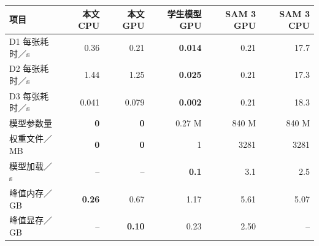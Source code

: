\begin{tabular}{lrrrrr}
\toprule
项目 & 本文 CPU & 本文 GPU & 学生模型 GPU & SAM 3 GPU & SAM 3 CPU \\
\midrule
D1 每张耗时／s & 0.36 & 0.21 & \textbf{0.014} & 0.21 & 17.7 \\
D2 每张耗时／s & 1.44 & 1.25 & \textbf{0.025} & 0.21 & 17.3 \\
D3 每张耗时／s & 0.041 & 0.079 & \textbf{0.002} & 0.21 & 18.3 \\
\midrule
模型参数量 & \textbf{0} & \textbf{0} & 0.27 M & 840 M & 840 M \\
权重文件／MB & \textbf{0} & \textbf{0} & 1 & 3281 & 3281 \\
模型加载／s & -- & -- & \textbf{0.1} & 3.1 & 2.5 \\
峰值内存／GB & \textbf{0.26} & 0.67 & 1.17 & 5.61 & 5.07 \\
峰值显存／GB & -- & \textbf{0.10} & 0.23 & 2.50 & -- \\
\bottomrule
\end{tabular}
